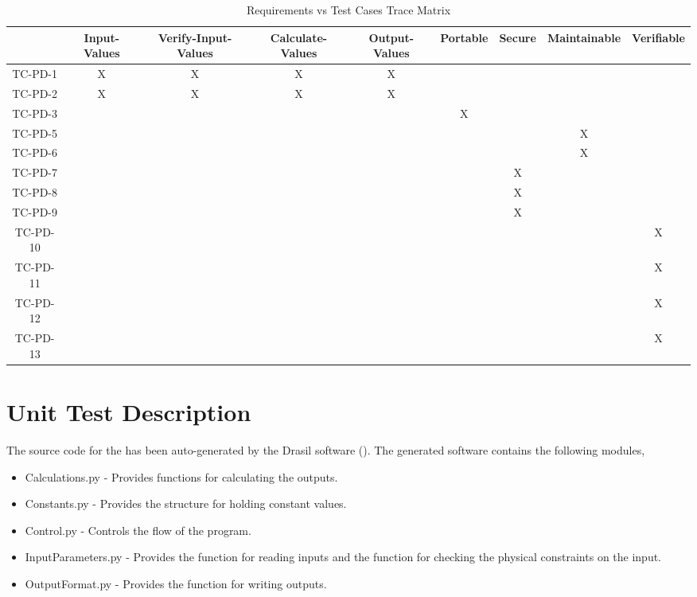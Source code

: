 \documentclass[12pt, titlepage]{article}
\begin{document}
\begin{table}[]
\begin{adjustbox}{width=1.29\textwidth}
\begin{tabular}{c|c|c|c|c|c|c|c|c|}
 & Input-Values & Verify-Input-Values & Calculate-Values & Output-Values & Portable & Secure & Maintainable & Verifiable \\ \hline
TC-PD-1 & X & X & X  & X  &  &  &  &  \\
TC-PD-2 & X  & X  & X & X &  &  &  &  \\
TC-PD-3  &  &  &  &   & X  &  &  &  \\
TC-PD-5  &  &  &  &  &  &  &X  &  \\
TC-PD-6  &  &  &  &  &  &  &X  &  \\
TC-PD-7  &  &  &  &  &  &X  &  &  \\
TC-PD-8  &  &  &  &  &  &X  &  &  \\
TC-PD-9  &  &  &  &  &  &X  &  &  \\
TC-PD-10 &  &  &  &  &  &  &  &X  \\
TC-PD-11 &  &  &  &  &  &  &  &X \\
TC-PD-12 &  &  &   &   &  &  &  &X  \\
TC-PD-13 &   &  &  &  &  &  &  &X \\
\end{tabular}
\end{adjustbox}
\caption{Requirements vs Test Cases Trace Matrix}
\label{tblTrace}
\end{table}

\section{Unit Test Description}  \label{sec_unit_tests}


The source code for the \progname{} has been auto-generated by the 
Drasil software (\cite{Drasil}). The generated software contains the following modules,

\begin{itemize}

\item Calculations.py  - Provides functions for calculating the outputs.

\item Constants.py  - Provides the structure for holding constant values.

\item Control.py  - Controls the flow of the program.

\item InputParameters.py - Provides the function for reading inputs and the function 
for checking the physical constraints on the input.

\item OutputFormat.py  -  Provides the function for writing outputs.

\end{itemize}
\end{document}
